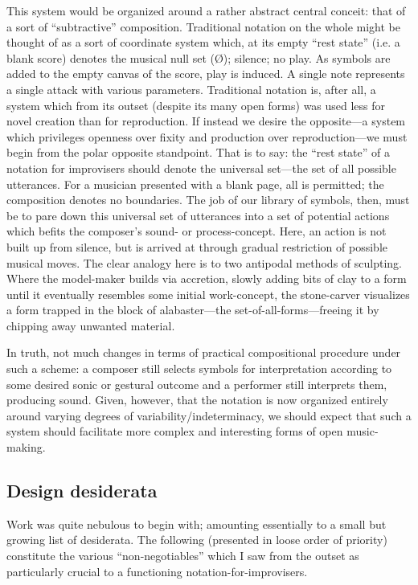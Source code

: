     This system would be organized around a rather abstract central conceit: that of a sort of ``subtractive'' composition. Traditional notation on the whole might be thought of as a sort of coordinate system which, at its empty ``rest state'' (i.e. a blank score) denotes the musical null set (\O); silence; no play. As symbols are added to the empty canvas of the score, play is induced. A single note represents a single attack with various parameters. Traditional notation is, after all, a system which from its outset (despite its many open forms) was used less for novel creation than for reproduction. If instead we desire the opposite---a system which privileges openness over fixity and production over reproduction---we must begin from the polar opposite standpoint. That is to say: the ``rest state'' of a notation for improvisers should denote the universal set---the set of all possible utterances. For a musician presented with a blank page, all is permitted; the composition denotes no boundaries. The job of our library of symbols, then, must be to pare down this universal set of utterances into a set of potential actions which befits the composer's sound- or process-concept. Here, an action is not built up from silence, but is arrived at through gradual restriction of possible musical moves. The clear analogy here is to two antipodal methods of sculpting. Where the model-maker builds via accretion, slowly adding bits of clay to a form until it eventually resembles some initial work-concept, the stone-carver visualizes a form trapped in the block of alabaster---the set-of-all-forms---freeing it by chipping away unwanted material.

    In truth, not much changes in terms of practical compositional procedure under such a scheme: a composer still selects symbols for interpretation according to some desired sonic or gestural outcome and a performer still interprets them, producing sound. Given, however, that the notation is now organized entirely around varying degrees of variability/indeterminacy, we should expect that such a system should facilitate more complex and interesting forms of open music-making. 

\subsection{Design desiderata}

     Work was quite nebulous to begin with; amounting essentially to a small but growing list of desiderata. The following (presented in loose order of priority) constitute the various ``non-negotiables'' which I saw from the outset as particularly crucial to a functioning notation-for-improvisers.
    
